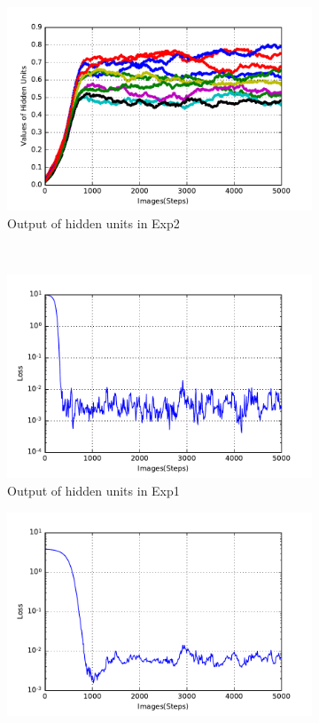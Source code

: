 \begin{figure}
\begin{subfigure}[t]{0.4\textwidth}
		\includegraphics[width=\textwidth]{pics_sdlm/30_exp_RBM/exp2_hid_non.pdf}
		\caption{Output of hidden units in Exp2}
	\end{subfigure}\\
	\begin{subfigure}[t]{0.4\textwidth}
		\includegraphics[width=\textwidth]{pics_sdlm/30_exp_RBM/exp1_loss.pdf}
		\caption{Output of hidden units in Exp1}
	\end{subfigure}
	\begin{subfigure}[t]{0.4\textwidth}
		\includegraphics[width=\textwidth]{pics_sdlm/30_exp_RBM/exp2_loss.pdf}

\end{subfigure}
\end{figure}

